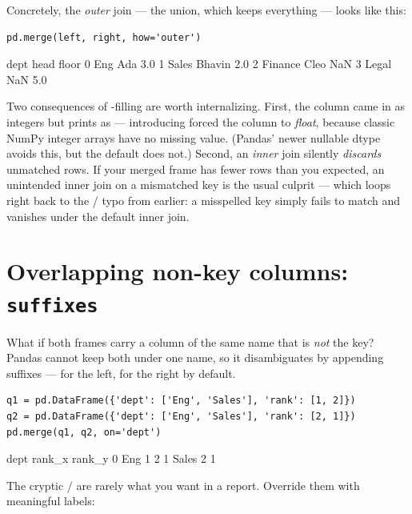 \documentclass[11pt]{article}
\begin{document}
Concretely, the \emph{outer} join --- the union, which keeps everything --- looks like this:

\begin{lstlisting}
pd.merge(left, right, how='outer')
\end{lstlisting}

\begin{outblock}
      dept    head  floor
0      Eng     Ada    3.0
1    Sales  Bhavin    2.0
2  Finance    Cleo    NaN
3    Legal     NaN    5.0
\end{outblock}

\begin{keyidea}
Two consequences of -filling are worth internalizing. First, the  column came in as integers but prints as  --- introducing  forced the column to \emph{float}, because classic NumPy integer arrays have no missing value. (Pandas' newer nullable  dtype avoids this, but the default does not.) Second, an \emph{inner} join silently \emph{discards} unmatched rows. If your merged frame has fewer rows than you expected, an unintended inner join on a mismatched key is the usual culprit --- which loops right back to the / typo from earlier: a misspelled key simply fails to match and vanishes under the default inner join.
\end{keyidea}

\section{Overlapping non-key columns: \texttt{suffixes}}

What if both frames carry a column of the same name that is \emph{not} the key? Pandas cannot keep both under one name, so it disambiguates by appending suffixes ---  for the left,  for the right by default.

\begin{lstlisting}
q1 = pd.DataFrame({'dept': ['Eng', 'Sales'], 'rank': [1, 2]})
q2 = pd.DataFrame({'dept': ['Eng', 'Sales'], 'rank': [2, 1]})
pd.merge(q1, q2, on='dept')
\end{lstlisting}

\begin{outblock}
    dept  rank_x  rank_y
0    Eng       1       2
1  Sales       2       1
\end{outblock}

The cryptic / are rarely what you want in a report. Override them with meaningful labels:
\end{document}
